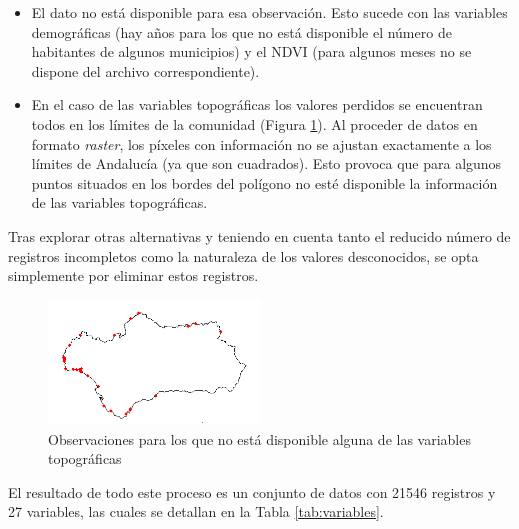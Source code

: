 \documentclass[12pt,a4paper,]{book}
\numberwithin{dummy}{section}
\theoremstyle{ocrenumbox}
\theoremstyle{blacknumex}
\theoremstyle{blacknumbox}
\theoremstyle{ocrenum}
\theoremstyle{ocrenum}
\begin{document}
\begin{itemize}
\item
  El dato no está disponible para esa observación. Esto sucede con las
  variables demográficas (hay años para los que no está disponible el
  número de habitantes de algunos municipios) y el NDVI (para algunos
  meses no se dispone del archivo correspondiente).
\item
  En el caso de las variables topográficas los valores perdidos se
  encuentran todos en los límites de la comunidad (Figura
  \ref{fig:nas_topograficas}). Al proceder de datos en formato
  \emph{raster}, los píxeles con información no se ajustan exactamente a
  los límites de Andalucía (ya que son cuadrados). Esto provoca que para
  algunos puntos situados en los bordes del polígono no esté disponible
  la información de las variables topográficas.
\end{itemize}

Tras explorar otras alternativas y teniendo en cuenta tanto el reducido
número de registros incompletos como la naturaleza de los valores
desconocidos, se opta simplemente por eliminar estos registros.

\begin{figure}[htb]
\centering
\includegraphics[width=0.5\textwidth]{graficos/nas_topograficas.png}
\caption{Observaciones para los que no está disponible alguna de las variables topográficas}
\label{fig:nas_topograficas}
\end{figure}

El resultado de todo este proceso es un conjunto de datos con 21546
registros y 27 variables, las cuales se detallan en la Tabla
\ref{tab:variables}.
\end{document}
